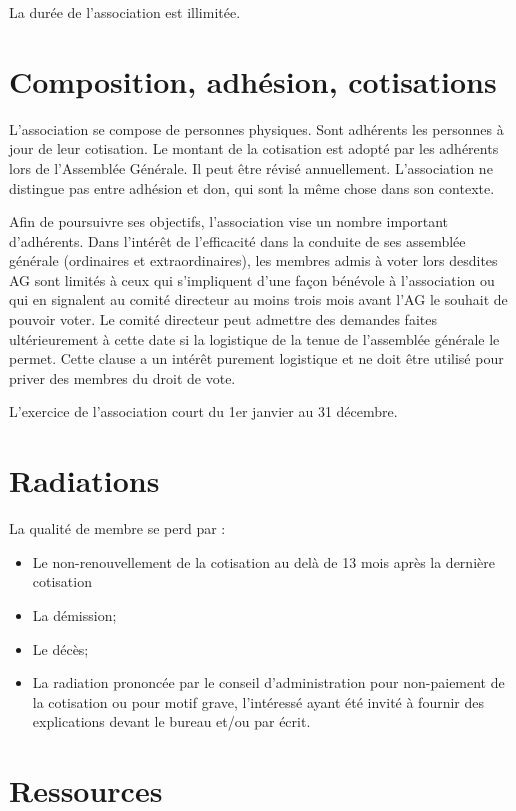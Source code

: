 \documentclass[11 pt]{article}
\begin{document}
La durée de l’association est illimitée.

\section{Composition, adhésion, cotisations}

L'association se compose de personnes physiques. Sont adhérents les
personnes à jour de leur cotisation.  Le montant de la cotisation est
adopté par les adhérents lors de l'Assemblée Générale. Il peut être
révisé annuellement.  L'association ne distingue pas entre adhésion et
don, qui sont la même chose dans son contexte.

Afin de poursuivre ses objectifs, l'association vise un nombre
important d'adhérents.  Dans l'intérêt de l'efficacité dans la conduite
de ses assemblée générale (ordinaires et extraordinaires), les membres
admis à voter lors desdites AG sont limités à ceux qui s'impliquent
d'une façon bénévole à l'association ou qui en signalent au comité
directeur au moins trois mois avant l’AG le souhait de pouvoir voter.
Le comité directeur peut admettre des demandes faites ultérieurement à
cette date si la logistique de la tenue de l’assemblée générale le
permet.  Cette clause a un intérêt purement logistique et ne doit être
utilisé pour priver des membres du droit de vote.

L'exercice de l'association court du 1er janvier au 31 décembre.

\section{Radiations}

La qualité de membre se perd par :
\begin{itemize}
\item Le non-renouvellement de la cotisation au delà de 13 mois après la dernière cotisation
\item La démission;
\item Le décès;
\item La radiation prononcée par le conseil d'administration pour
  non-paiement de la cotisation ou pour motif grave, l'intéressé ayant
  été invité à fournir des explications devant le bureau et/ou par
  écrit.
\end{itemize}


\section{Ressources}
\end{document}
